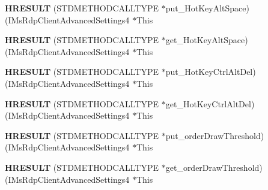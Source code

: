 \begin{DoxyCompactItemize}
\item 
\mbox{\label{struct_i_ms_rdp_client_advanced_settings4_vtbl_adc81fa401e2fb2af0ad2d40928d742ba}} 
{\bfseries H\+R\+E\+S\+U\+LT} (S\+T\+D\+M\+E\+T\+H\+O\+D\+C\+A\+L\+L\+T\+Y\+PE $\ast$put\+\_\+\+Hot\+Key\+Alt\+Space)(I\+Ms\+Rdp\+Client\+Advanced\+Settings4 $\ast$This
\item 
\mbox{\label{struct_i_ms_rdp_client_advanced_settings4_vtbl_a55e589a619a18988270e097acce09903}} 
{\bfseries H\+R\+E\+S\+U\+LT} (S\+T\+D\+M\+E\+T\+H\+O\+D\+C\+A\+L\+L\+T\+Y\+PE $\ast$get\+\_\+\+Hot\+Key\+Alt\+Space)(I\+Ms\+Rdp\+Client\+Advanced\+Settings4 $\ast$This
\item 
\mbox{\label{struct_i_ms_rdp_client_advanced_settings4_vtbl_a0833c8dd55d5daee11498c0ef6aa9050}} 
{\bfseries H\+R\+E\+S\+U\+LT} (S\+T\+D\+M\+E\+T\+H\+O\+D\+C\+A\+L\+L\+T\+Y\+PE $\ast$put\+\_\+\+Hot\+Key\+Ctrl\+Alt\+Del)(I\+Ms\+Rdp\+Client\+Advanced\+Settings4 $\ast$This
\item 
\mbox{\label{struct_i_ms_rdp_client_advanced_settings4_vtbl_ac7c25b629e647649bacf7c445fe28c8a}} 
{\bfseries H\+R\+E\+S\+U\+LT} (S\+T\+D\+M\+E\+T\+H\+O\+D\+C\+A\+L\+L\+T\+Y\+PE $\ast$get\+\_\+\+Hot\+Key\+Ctrl\+Alt\+Del)(I\+Ms\+Rdp\+Client\+Advanced\+Settings4 $\ast$This
\item 
\mbox{\label{struct_i_ms_rdp_client_advanced_settings4_vtbl_ad1f91b1038af1c12ff4af5e923088e7b}} 
{\bfseries H\+R\+E\+S\+U\+LT} (S\+T\+D\+M\+E\+T\+H\+O\+D\+C\+A\+L\+L\+T\+Y\+PE $\ast$put\+\_\+order\+Draw\+Threshold)(I\+Ms\+Rdp\+Client\+Advanced\+Settings4 $\ast$This
\item 
\mbox{\label{struct_i_ms_rdp_client_advanced_settings4_vtbl_a751b28bec60df06f767ebb1bdba47a67}} 
{\bfseries H\+R\+E\+S\+U\+LT} (S\+T\+D\+M\+E\+T\+H\+O\+D\+C\+A\+L\+L\+T\+Y\+PE $\ast$get\+\_\+order\+Draw\+Threshold)(I\+Ms\+Rdp\+Client\+Advanced\+Settings4 $\ast$This
\item 
\mbox{\label{struct_i_ms_rdp_client_advanced_settings4_vtbl_a78252025defe22605037c0d936b59275}} 

\end{DoxyCompactItemize}
